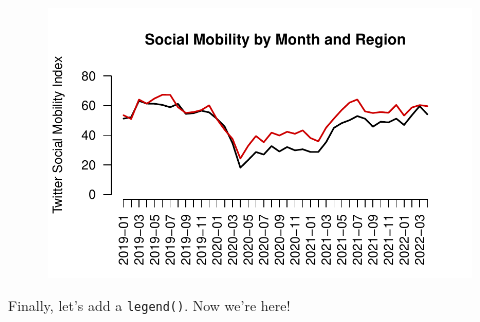 \documentclass[
  letterpaper,
  DIV=11,
  numbers=noendperiod]{scrreprt}
\begin{document}
\begin{figure}[H]

{\centering \includegraphics{05-Causalityii_files/figure-pdf/unnamed-chunk-17-1.pdf}

}

\end{figure}

Finally, let's add a \texttt{legend()}. Now we're here!
\end{document}

